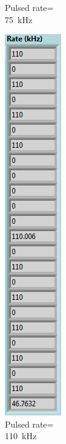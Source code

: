 \begin{figure}[H]
\begin{minipage}{0.24\textwidth}
		\caption{Pulsed rate=\\75~kHz}
		\label{fig:75khz}
	\end{minipage}
	\begin{minipage}{0.24\textwidth}
		\centering
		\includegraphics[width=.7\linewidth]{IMG/ch5/latch_tests/fig19}
		\caption{Pulsed rate=\\110~kHz}
		\label{fig:110khz}
	\end{minipage}
\end{figure}
